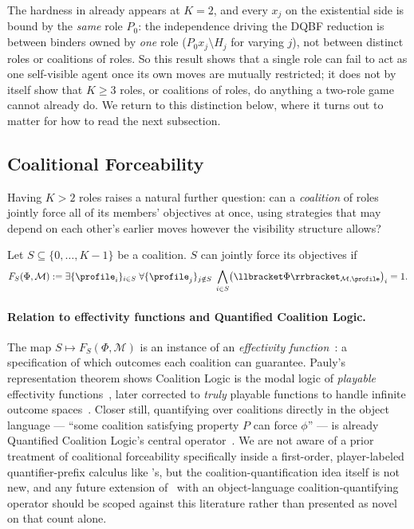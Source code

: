 \begin{remark}[This construction is a $K=2$, single-role phenomenon]
\label{rem:nexptime-is-k2}
The hardness in  already appears at $K=2$, and every
$x_j$ on the existential side is bound by the \emph{same} role $P_0$: the
independence driving the DQBF reduction is between binders owned by \emph{one}
role ($P_0 x_j \setminus H_j$ for varying $j$), not between distinct roles or
coalitions of roles. So this result shows that a single role can fail to act
as one self-visible agent once its own moves are mutually restricted; it does
not by itself show that $K \ge 3$ roles, or coalitions of roles, do anything a
two-role game cannot already do. We return to this distinction below, where it
turns out to matter for how to read the next subsection.
\end{remark}

\subsection{Coalitional Forceability}
\label{subsec:coalitional-forceability}

Having $K > 2$ roles raises a natural further question: can a
\emph{coalition} of roles jointly force all of its members' objectives at
once, using strategies that may depend on each other's earlier moves however
the visibility structure allows?

\begin{definition}
Let $S \subseteq \{0,\ldots,K-1\}$ be a coalition.
$S$ can jointly force its objectives if
\[
F_S(\Phi,\mathcal M)
:= \exists \{\profile_i\}_{i \in S}\;
   \forall \{\profile_j\}_{j \notin S}\;
   \bigwedge_{i \in S} \bigl( \llbracket \Phi \rrbracket_{\mathcal M, \profile} \bigr)_i = 1.
\]
\end{definition}

\paragraph{Relation to effectivity functions and Quantified Coalition Logic.}
The map $S \mapsto F_S(\Phi,\mathcal M)$ is an instance of an \emph{effectivity
function}~\cite{MoulinPeleg1982EffectivityFunctions}: a specification of which
outcomes each coalition can guarantee. Pauly's representation theorem shows
Coalition Logic is the modal logic of \emph{playable} effectivity
functions~\cite{pauly2002modal}, later corrected to \emph{truly} playable
functions to handle infinite outcome spaces~\cite{GorankoJamrogaTurrini2013TrulyPlayable}.
Closer still, quantifying over coalitions directly in the object language ---
``some coalition satisfying property $P$ can force $\phi$'' --- is already
Quantified Coalition Logic's central
operator~\cite{AgotnesVanDerHoekWooldridge2008QCL}. We are not aware of a
prior treatment of coalitional forceability specifically inside a
first-order, player-labeled quantifier-prefix calculus like \KFOL's, but the
coalition-quantification idea itself is not new, and any future extension of
\KFOL\ with an object-language coalition-quantifying operator should be
scoped against this literature rather than presented as novel on that count
alone.

